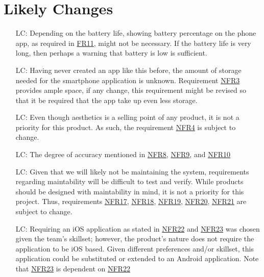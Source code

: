 \documentclass[12pt]{article}
\newcounter{lcnum} %
\begin{document}



\section{Likely Changes}    

\begin{itemize}

\item[LC\refstepcounter{lcnum}\thelcnum\label{LC_meaningfulLabel}:]  Depending on the battery life, showing battery percentage on the phone app, as required in \hyperref[FR11]{FR11}, might not be necessary. If the battery life is very long, then perhaps a warning that battery is low is sufficient. 
\item[LC\refstepcounter{lcnum}\thelcnum\label{LC_meaningfulLabel}:] Having never created an app like this before, the amount of storage needed for the smartphone application is unknown. Requirement \hyperref[NFR3]{NFR3} provides ample space, if any change, this requirement might be revised so that it be required that the app take up even less storage. 
\item[LC\refstepcounter{lcnum}\thelcnum\label{LC_meaningfulLabel}:] Even though aesthetics is a selling point of any product, it is not a priority for this product. As such, the requirement \hyperref[NFR4]{NFR4} is subject to change. 
\item[LC\refstepcounter{lcnum}\thelcnum\label{LC_meaningfulLabel}:] The degree of accuracy mentioned in \hyperref[NFR8]{NFR8}, \hyperref[NFR9]{NFR9}, and \hyperref[NFR10]{NFR10}
\item[LC\refstepcounter{lcnum}\thelcnum\label{LC_meaningfulLabel}:] Given that we will likely not be maintaining the system, requirements regarding maintability will be difficult to test and verify. While products should be designed with maintability in mind, it is not a priority for this project. Thus, requirements \hyperref[NFR17]{NFR17}, \hyperref[NFR18]{NFR18}, \hyperref[NFR19]{NFR19}, \hyperref[NFR20]{NFR20}, \hyperref[NFR21]{NFR21} are subject to change. 
\item[LC\refstepcounter{lcnum}\thelcnum\label{LC_meaningfulLabel}:] Requiring an iOS application as stated in \hyperref[NFR22]{NFR22} and \hyperref[NFR23]{NFR23} was chosen given the team's skillset; however, the product's nature does not require the application to be iOS based. Given different preferences and/or skillset, this application could be substituted or extended to an Android application. Note that \hyperref[NFR23]{NFR23} is dependent on \hyperref[NFR22]{NFR22}

\end{itemize}
\end{document}
